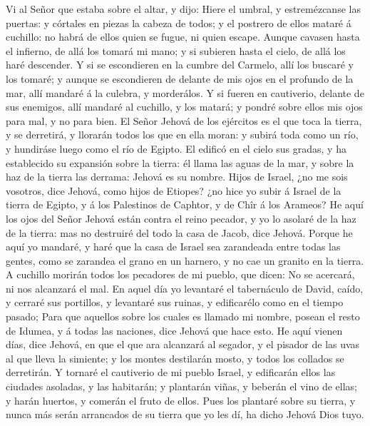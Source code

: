  Vi al Señor que estaba sobre el altar, y dijo: Hiere el
umbral, y estremézcanse las puertas: y córtales en piezas la cabeza de
todos; y el postrero de ellos mataré á cuchillo: no habrá de ellos quien
se fugue, ni quien escape.  Aunque cavasen hasta el
infierno, de allá los tomará mi mano; y si subieren hasta el cielo, de
allá los haré descender.  Y si se escondieren en la cumbre
del Carmelo, allí los buscaré y los tomaré; y aunque se escondieren de
delante de mis ojos en el profundo de la mar, allí mandaré á la culebra,
y morderálos.  Y si fueren en cautiverio, delante de sus
enemigos, allí mandaré al cuchillo, y los matará; y pondré sobre ellos
mis ojos para mal, y no para bien.  El Señor Jehová de los
ejércitos es el que toca la tierra, y se derretirá, y llorarán todos los
que en ella moran: y subirá toda como un río, y hundiráse luego como el
río de Egipto.  El edificó en el cielo sus gradas, y ha
establecido su expansión sobre la tierra: él llama las aguas de la mar,
y sobre la haz de la tierra las derrama: Jehová es su nombre.
 Hijos de Israel, ¿no me sois vosotros, dice Jehová, como
hijos de Etiopes? ¿no hice yo subir á Israel de la tierra de Egipto, y á
los Palestinos de Caphtor, y de Chîr á los Arameos?  He
aquí los ojos del Señor Jehová están contra el reino pecador, y yo lo
asolaré de la haz de la tierra: mas no destruiré del todo la casa de
Jacob, dice Jehová.  Porque he aquí yo mandaré, y haré que
la casa de Israel sea zarandeada entre todas las gentes, como se
zarandea el grano en un harnero, y no cae un granito en la tierra.
 A cuchillo morirán todos los pecadores de mi pueblo, que
dicen: No se acercará, ni nos alcanzará el mal.  En aquel
día yo levantaré el tabernáculo de David, caído, y cerraré sus
portillos, y levantaré sus ruinas, y edificarélo como en el tiempo
pasado;  Para que aquellos sobre los cuales es llamado mi
nombre, posean el resto de Idumea, y á todas las naciones, dice Jehová
que hace esto.  He aquí vienen días, dice Jehová, en que
el que ara alcanzará al segador, y el pisador de las uvas al que lleva
la simiente; y los montes destilarán mosto, y todos los collados se
derretirán.  Y tornaré el cautiverio de mi pueblo Israel,
y edificarán ellos las ciudades asoladas, y las habitarán; y plantarán
viñas, y beberán el vino de ellas; y harán huertos, y comerán el fruto
de ellos.  Pues los plantaré sobre su tierra, y nunca más
serán arrancados de su tierra que yo les dí, ha dicho Jehová Dios tuyo.
